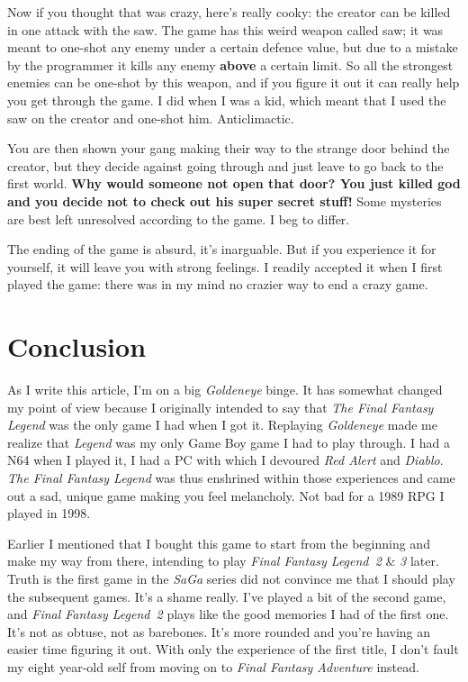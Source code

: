 \documentclass{book}
\begin{document}
Now if you thought that was crazy, here’s really cooky: the creator can be killed in one attack with the saw. The game has this weird weapon called saw; it was meant to one-shot any enemy under a certain defence value, but due to a mistake by the programmer it kills any enemy \textbf{above} a certain limit. So all the strongest enemies can be one-shot by this weapon, and if you figure it out it can really help you get through the game. I did when I was a kid, which meant that I used the saw on the creator and one-shot him. Anticlimactic.

You are then shown your gang making their way to the strange door behind the creator, but they decide against going through and just leave to go back to the first world. \textbf{Why would someone not open that door? You just killed god and you decide not to check out his super secret stuff!} Some mysteries are best left unresolved according to the game. I beg to differ.

The ending of the game is absurd, it’s inarguable. But if you experience it for yourself, it will leave you with strong feelings. I readily accepted it when I first played the game: there was in my mind no crazier way to end a crazy game.

\FloatBarrier\needspace{5pt}\section*{Conclusion}\nopagebreak[4]

As I write this article, I’m on a big \emph{Goldeneye} binge. It has somewhat changed my point of view because I originally intended to say that \emph{The Final Fantasy Legend} was the only game I had when I got it. Replaying \emph{Goldeneye} made me realize that \emph{Legend} was my only Game Boy game I had to play through. I had a N64 when I played it, I had a PC with which I devoured \emph{Red Alert} and \emph{Diablo}. \emph{The Final Fantasy Legend} was thus enshrined within those experiences and came out a sad, unique game making you feel melancholy. Not bad for a 1989 RPG I played in 1998.

Earlier I mentioned that I bought this game to start from the beginning and make my way from there, intending to play \emph{Final Fantasy Legend 2} \& \emph{3} later. Truth is the first game in the \emph{SaGa} series did not convince me that I should play the subsequent games. It’s a shame really. I’ve played a bit of the second game, and \emph{Final Fantasy Legend 2} plays like the good memories I had of the first one. It’s not as obtuse, not as barebones. It’s more rounded and you’re having an easier time figuring it out. With only the experience of the first title, I don’t fault my eight year-old self from moving on to \emph{Final Fantasy Adventure} instead.
\end{document}

